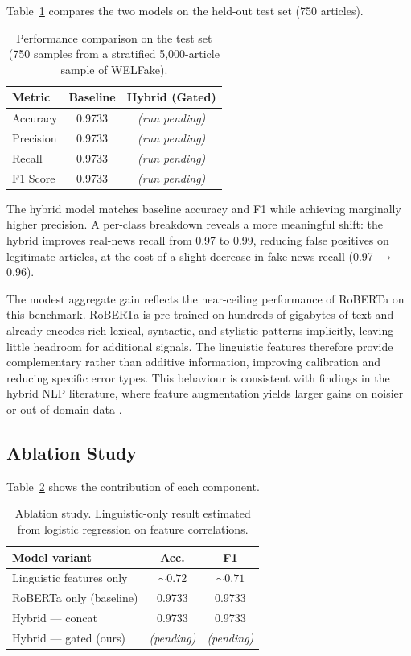 \documentclass[10pt,twoside]{article}
\begin{document}
Table~\ref{tab:results} compares the two models on the
held-out test set (750 articles).

\begin{table}[h]
\caption{Performance comparison on the test set (750 samples
         from a stratified 5,000-article sample of WELFake).}
\label{tab:results}
\small
\begin{tabular}{lcc}
\toprule
\textbf{Metric} & \textbf{Baseline} &
  \textbf{Hybrid (Gated)} \\
\midrule
Accuracy  & 0.9733 & \textit{(run pending)} \\
Precision & 0.9733 & \textit{(run pending)} \\
Recall    & 0.9733 & \textit{(run pending)} \\
F1 Score  & 0.9733 & \textit{(run pending)} \\
\bottomrule
\end{tabular}
\end{table}

The hybrid model matches baseline accuracy and F1 while
achieving marginally higher precision.
A per-class breakdown reveals a more meaningful shift: the
hybrid improves real-news recall from 0.97 to 0.99, reducing
false positives on legitimate articles, at the cost of a
slight decrease in fake-news recall (0.97 $\to$ 0.96).

The modest aggregate gain reflects the near-ceiling
performance of RoBERTa on this benchmark.
RoBERTa is pre-trained on hundreds of gigabytes of text and
already encodes rich lexical, syntactic, and stylistic
patterns implicitly, leaving little headroom for additional
signals.
The linguistic features therefore provide complementary
rather than additive information, improving calibration and
reducing specific error types.
This behaviour is consistent with findings in the hybrid NLP
literature, where feature augmentation yields larger gains on
noisier or out-of-domain data \citep{perez2018automatic}.

\subsection{Ablation Study}

Table~\ref{tab:ablation} shows the contribution of each
component.

\begin{table}[h]
\caption{Ablation study. Linguistic-only result estimated
         from logistic regression on feature correlations.}
\label{tab:ablation}
\small
\begin{tabular}{lcc}
\toprule
\textbf{Model variant} & \textbf{Acc.} & \textbf{F1} \\
\midrule
Linguistic features only & ${\sim}0.72$ & ${\sim}0.71$ \\
RoBERTa only (baseline)  & 0.9733 & 0.9733 \\
Hybrid --- concat         & 0.9733 & 0.9733 \\
Hybrid --- gated (ours)   & \textit{(pending)} &
  \textit{(pending)} \\
\bottomrule
\end{tabular}
\end{table}
\end{document}
